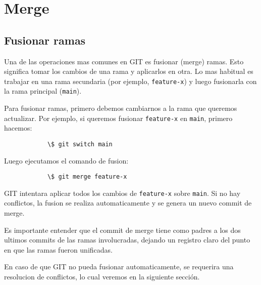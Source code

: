 \section{Merge}

    \subsection{Fusionar ramas}
        Una de las operaciones mas comunes en GIT es fusionar (merge) ramas. Esto significa tomar los cambios de una rama y aplicarlos en otra. Lo mas habitual es trabajar en una rama secundaria (por ejemplo, \texttt{feature-x}) y luego fusionarla con la rama principal (\texttt{main}).

        Para fusionar ramas, primero debemos cambiarnos a la rama que queremos actualizar. Por ejemplo, si queremos fusionar \texttt{feature-x} en \texttt{main}, primero hacemos:

        \begin{lstlisting}
            \$ git switch main
        \end{lstlisting}

        Luego ejecutamos el comando de fusion:

        \begin{lstlisting}
            \$ git merge feature-x
        \end{lstlisting}

        GIT intentara aplicar todos los cambios de \texttt{feature-x} sobre \texttt{main}. Si no hay conflictos, la fusion se realiza automaticamente y se genera un nuevo commit de merge.

        Es importante entender que el commit de merge tiene como padres a los dos ultimos commits de las ramas involucradas, dejando un registro claro del punto en que las ramas fueron unificadas.

        En caso de que GIT no pueda fusionar automaticamente, se requerira una resolucion de conflictos, lo cual veremos en la siguiente secci\'on.
